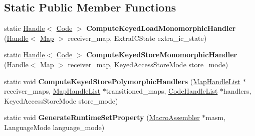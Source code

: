 \subsection*{Static Public Member Functions}
\begin{DoxyCompactItemize}
\item 
static \hyperlink{classv8_1_1internal_1_1_handle}{Handle}$<$ \hyperlink{classv8_1_1internal_1_1_code}{Code} $>$ {\bfseries Compute\+Keyed\+Load\+Monomorphic\+Handler} (\hyperlink{classv8_1_1internal_1_1_handle}{Handle}$<$ \hyperlink{classv8_1_1internal_1_1_map}{Map} $>$ receiver\+\_\+map, Extra\+I\+C\+State extra\+\_\+ic\+\_\+state)\hypertarget{classv8_1_1internal_1_1_property_i_c_compiler_a3260d32b73605afcd0799147e9700480}{}\label{classv8_1_1internal_1_1_property_i_c_compiler_a3260d32b73605afcd0799147e9700480}

\item 
static \hyperlink{classv8_1_1internal_1_1_handle}{Handle}$<$ \hyperlink{classv8_1_1internal_1_1_code}{Code} $>$ {\bfseries Compute\+Keyed\+Store\+Monomorphic\+Handler} (\hyperlink{classv8_1_1internal_1_1_handle}{Handle}$<$ \hyperlink{classv8_1_1internal_1_1_map}{Map} $>$ receiver\+\_\+map, Keyed\+Access\+Store\+Mode store\+\_\+mode)\hypertarget{classv8_1_1internal_1_1_property_i_c_compiler_ab9e9c89ffa81a2668306a650c3e5f0a5}{}\label{classv8_1_1internal_1_1_property_i_c_compiler_ab9e9c89ffa81a2668306a650c3e5f0a5}

\item 
static void {\bfseries Compute\+Keyed\+Store\+Polymorphic\+Handlers} (\hyperlink{classv8_1_1internal_1_1_list}{Map\+Handle\+List} $\ast$receiver\+\_\+maps, \hyperlink{classv8_1_1internal_1_1_list}{Map\+Handle\+List} $\ast$transitioned\+\_\+maps, \hyperlink{classv8_1_1internal_1_1_list}{Code\+Handle\+List} $\ast$handlers, Keyed\+Access\+Store\+Mode store\+\_\+mode)\hypertarget{classv8_1_1internal_1_1_property_i_c_compiler_a1fb5d1f10d8ed5d5cbec497676ca3472}{}\label{classv8_1_1internal_1_1_property_i_c_compiler_a1fb5d1f10d8ed5d5cbec497676ca3472}

\item 
static void {\bfseries Generate\+Runtime\+Set\+Property} (\hyperlink{classv8_1_1internal_1_1_macro_assembler}{Macro\+Assembler} $\ast$masm, Language\+Mode language\+\_\+mode)\hypertarget{classv8_1_1internal_1_1_property_i_c_compiler_ac83d836e3df43b27221ae774daf80237}{}\label{classv8_1_1internal_1_1_property_i_c_compiler_ac83d836e3df43b27221ae774daf80237}

\end{DoxyCompactItemize}
